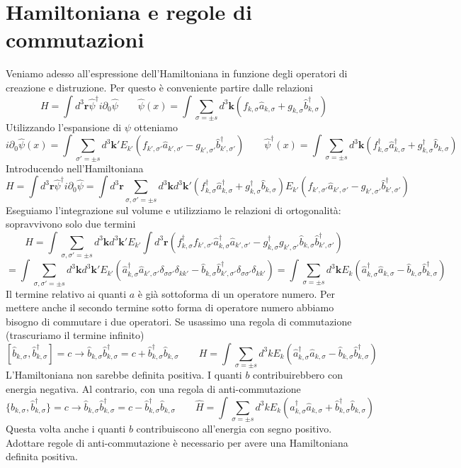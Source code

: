 \section{Hamiltoniana e regole di commutazioni}
Veniamo adesso all'espressione dell'Hamiltoniana in funzione degli operatori di creazione e distruzione. Per questo è conveniente partire dalle relazioni
$$
H = \int d^3\mathbf{r} \hat{\psi}^\dagger i \partial_0 \hat{\psi} \qquad \hat{\psi}(x) = \int \sum_{\sigma=\pm s} d^3\mathbf{k} (f_{k,\sigma} \hat{a}_{k,\sigma} + g_{k,\sigma} \hat{b}_{k,\sigma}^\dagger)
$$
Utilizzando l'espansione di $\psi$ otteniamo
$$
i\partial_0 \hat{\psi}(x) = \int \sum_{\sigma'=\pm s} d^3\mathbf{k}' E_{k'} (f_{k',\sigma'} \hat{a}_{k',\sigma'} - g_{k',\sigma'} \hat{b}_{k',\sigma'}^\dagger) \qquad \hat{\psi}^\dagger(x) = \int \sum_{\sigma=\pm s} d^3\mathbf{k} (f_{k,\sigma}^\dagger \hat{a}_{k,\sigma}^\dagger + g_{k,\sigma}^\dagger \hat{b}_{k,\sigma})
$$
Introducendo nell'Hamiltoniana
$$
H = \int d^3\mathbf{r} \hat{\psi}^\dagger i \partial_0 \hat{\psi} = \int d^3\mathbf{r} \sum_{\sigma,\sigma'=\pm s} d^3\mathbf{k} d^3\mathbf{k}' (f_{k,\sigma}^\dagger \hat{a}_{k,\sigma}^\dagger + g_{k,\sigma}^\dagger \hat{b}_{k,\sigma}) E_{k'} (f_{k',\sigma'} \hat{a}_{k',\sigma'} - g_{k',\sigma'} \hat{b}_{k',\sigma'}^\dagger)
$$
Eseguiamo l'integrazione sul volume e utilizziamo le relazioni di ortogonalità: sopravvivono solo due termini
$$
H = \int \sum_{\sigma,\sigma'=\pm s} d^3\mathbf{k} d^3\mathbf{k}' E_{k'} \int d^3\mathbf{r} (f_{k,\sigma}^\dagger f_{k',\sigma'} \hat{a}_{k,\sigma}^\dagger \hat{a}_{k',\sigma'} - g_{k,\sigma}^\dagger g_{k',\sigma'} \hat{b}_{k,\sigma} \hat{b}_{k',\sigma'}^\dagger)
$$
$$
= \int \sum_{\sigma,\sigma'=\pm s} d^3\mathbf{k} d^3\mathbf{k}' E_{k'} (\hat{a}_{k,\sigma}^\dagger \hat{a}_{k',\sigma'} \delta_{\sigma\sigma'}\delta_{kk'} - \hat{b}_{k,\sigma} \hat{b}_{k',\sigma'}^\dagger \delta_{\sigma\sigma'}\delta_{kk'}) = \int \sum_{\sigma=\pm s} d^3\mathbf{k} E_k (\hat{a}_{k,\sigma}^\dagger \hat{a}_{k,\sigma} - \hat{b}_{k,\sigma} \hat{b}_{k,\sigma}^\dagger)
$$
Il termine relativo ai quanti $a$ è già sottoforma di un operatore numero. Per mettere anche il secondo termine sotto forma di operatore numero abbiamo bisogno di commutare i due operatori. Se usassimo una regola di commutazione (trascuriamo il termine infinito)
$$
[\hat{b}_{k,\sigma}, \hat{b}_{k,\sigma}^\dagger] = c \to \hat{b}_{k,\sigma} \hat{b}_{k,\sigma}^\dagger = c + \hat{b}_{k,\sigma}^\dagger \hat{b}_{k,\sigma} \qquad H = \int \sum_{\sigma=\pm s} d^3k E_k (\hat{a}_{k,\sigma}^\dagger \hat{a}_{k,\sigma} - \hat{b}_{k,\sigma} \hat{b}_{k,\sigma}^\dagger)
$$
L'Hamiltoniana non sarebbe definita positiva. I quanti $b$ contribuirebbero con energia negativa. Al contrario, con una regola di anti-commutazione
$$
\{\hat{b}_{k,\sigma}, \hat{b}_{k,\sigma}^\dagger\} = c \to \hat{b}_{k,\sigma} \hat{b}_{k,\sigma}^\dagger = c - \hat{b}_{k,\sigma}^\dagger \hat{b}_{k,\sigma} \qquad \hat{H} = \int \sum_{\sigma=\pm s} d^3k E_k (\hat{a}_{k,\sigma}^\dagger \hat{a}_{k,\sigma} + \hat{b}_{k,\sigma}^\dagger \hat{b}_{k,\sigma})
$$
Questa volta anche i quanti $b$ contribuiscono all'energia con segno positivo. Adottare regole di anti-commutazione è necessario per avere una Hamiltoniana definita positiva.
